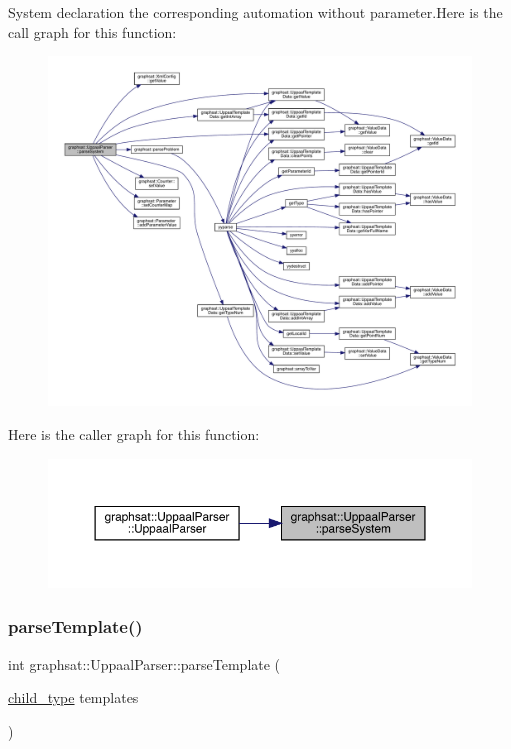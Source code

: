 System declaration the corresponding automation without parameter.Here is the call graph for this function\+:
\nopagebreak
\begin{figure}[H]
\begin{center}
\leavevmode
\includegraphics[width=350pt]{classgraphsat_1_1_uppaal_parser_ac9dd720630e0d655635396e651d13465_cgraph}
\end{center}
\end{figure}
Here is the caller graph for this function\+:
\nopagebreak
\begin{figure}[H]
\begin{center}
\leavevmode
\includegraphics[width=350pt]{classgraphsat_1_1_uppaal_parser_ac9dd720630e0d655635396e651d13465_icgraph}
\end{center}
\end{figure}
\mbox{\label{classgraphsat_1_1_uppaal_parser_a65d4465e1a96053627ef222a05a22356}} 
\subsubsection{\texorpdfstring{parseTemplate()}{parseTemplate()}}
{\footnotesize\ttfamily int graphsat\+::\+Uppaal\+Parser\+::parse\+Template (\begin{DoxyParamCaption}\item[{\mbox{\hyperlink{namespacegraphsat_aba2f5cf076d49898cc0469bee94d3a05}{child\+\_\+type}}}]{templates }\end{DoxyParamCaption})\hspace{0.3cm}{\ttfamily [private]}}

